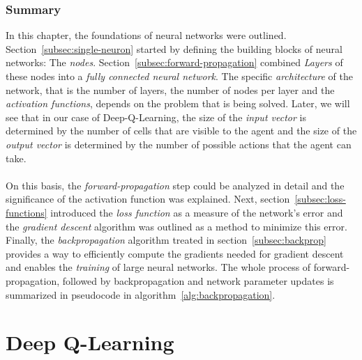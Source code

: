 \subsection{Summary}
\label{subsec:nn-summary}
In this chapter, the foundations of neural networks were outlined.
Section~\ref{subsec:single-neuron} started by defining the building blocks of neural networks: The \textit{nodes}.
Section~\ref{subsec:forward-propagation} combined \textit{Layers} of these nodes into a \textit{fully connected neural network}.
The specific \textit{architecture} of the network, that is the number of layers, the number of nodes per layer and the \textit{activation functions}, depends on the problem that is being solved.
Later, we will see that in our case of Deep-Q-Learning, the size of the \textit{input vector} is determined by the number of cells that are visible to the agent and the size of the \textit{output vector} is determined by the number of possible actions that the agent can take.
\\
\\
On this basis, the \textit{forward-propagation} step could be analyzed in detail and the significance of the activation function was explained.
Next, section~\ref{subsec:loss-functions} introduced the \textit{loss function} as a measure of the network's error and the \textit{gradient descent} algorithm was outlined as a method to minimize this error.
Finally, the \textit{backpropagation} algorithm treated in section~\ref{subsec:backprop} provides a way to efficiently compute the gradients needed for gradient descent and enables the \textit{training} of large neural networks.
The whole process of forward-propagation, followed by backpropagation and network parameter updates is summarized in pseudocode in algorithm~\ref{alg:backpropagation}.





\chapter{Deep Q-Learning}
\label{ch:dql}



